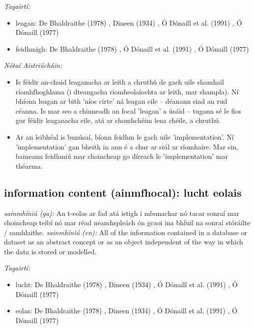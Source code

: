 \documentclass{article}
\begin{document}
 \noindent \textit{Tagairtí:}
\begin{itemize}
	\item leagan: De Bhaldraithe (1978) \cite{de-bhaldraithe}, Dineen (1934) \cite{dineen}, Ó Dónaill et al. (1991) \cite{focloir-beag}, Ó Dónaill (1977) \cite{odonaill}
	\item feidhmigh: De Bhaldraithe (1978) \cite{de-bhaldraithe}, Ó Dónaill et al. (1991) \cite{focloir-beag}, Ó Dónaill (1977) \cite{odonaill}
\end{itemize}

 \noindent \textit{Nótaí Aistriúcháin:}
\begin{itemize}
	\item Is féidir an-chuid leaganacha ar leith a chruthú de gach uile shamhail ríomhfhoghlama (i dteangacha ríomheolaíochta ar leith, mar shampla). Ní bhíonn leagan ar bith 'níos cirte' ná leagan eile -- déanann siad an rud céanna. Is mar seo a chinneadh an focal 'leagan' a úsáid -- tugann sé le fios gur féidir leaganacha eile, atá ar chomhchéim lena chéile, a chruthú.
	\item Ar an leibhéal is bunúsaí, bíonn feidhm le gach uile 'implementation'. Ní 'implementation' gan bheith in ann é a chur ar siúl ar ríomhaire. Mar sin, baineann feidhmiú mar choincheap go díreach le 'implementation' mar théarma.
\end{itemize}


\subsection*{information content (ainmfhocal): lucht eolais} 
 \noindent \textit{sainmhíniú (ga):} An t-eolas ar fad atá istigh i mbunachar nó tacar sonraí mar choincheap teibí nó mar réad neamhspleách ón gcaoi ina bhfuil na sonraí stóráilte / samhlaithe.
\newline\newline
 \noindent \textit{sainmhíniú (en):} All of the information contained in a database or dataset as an abstract concept or as an object independent of the way in which the data is stored or modelled.
\newline

 \noindent \textit{Tagairtí:}
\begin{itemize}
	\item lucht: De Bhaldraithe (1978) \cite{de-bhaldraithe}, Dineen (1934) \cite{dineen}, Ó Dónaill et al. (1991) \cite{focloir-beag}, Ó Dónaill (1977) \cite{odonaill}
	\item eolas: De Bhaldraithe (1978) \cite{de-bhaldraithe}, Dineen (1934) \cite{dineen}, Ó Dónaill et al. (1991) \cite{focloir-beag}, Ó Dónaill (1977) \cite{odonaill}
\end{itemize}
\end{document}
